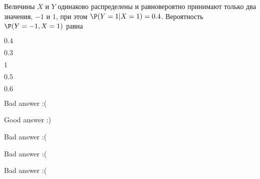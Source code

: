 
\begin{question}
Величины \(X\) и \(Y\) одинаково распределены и равновероятно принимают
только два значения, \(-1\) и \(1\), при этом \(\P(Y=1|X=1)=0.4\).
Вероятность \(\P(Y=-1,X=1)\) равна
\begin{answerlist}
  \item \(0.4\)
  \item \(0.3\)
  \item \(1\)
  \item \(0.5\)
  \item \(0.6\)
\end{answerlist}
\end{question}

\begin{solution}
\begin{answerlist}
  \item Bad answer :(
  \item Good answer :)
  \item Bad answer :(
  \item Bad answer :(
  \item Bad answer :(
\end{answerlist}
\end{solution}

